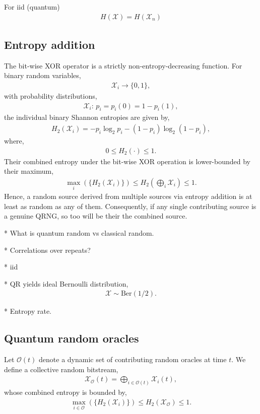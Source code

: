\documentclass[twocolumn, aps, amsmath, amssymb, nofootinbib, superscriptaddress, longbibliography, floatfix, eqsecnum, rmp]{revtex4-2}
\begin{document}
For iid (quantum)
\begin{align}
	H(\mathcal{X}) = H(\mathcal{X}_n)
\end{align}

\subsection{Entropy addition} \label{sec:entropy_add}

The bit-wise XOR operator is a strictly non-entropy-decreasing function. For binary random variables,
\begin{align}
	\mathcal{X}_i\to\{0,1\},
\end{align}
with probability distributions,
\begin{align}
	\mathcal{X}_i:\, p_i=p_i(0)=1-p_i(1),
\end{align}
the individual binary Shannon entropies are given by,
\begin{align}
	H_2(\mathcal{X}_i) = -p_i\log_2 p_i - (1-p_i)\log_2(1-p_i),
\end{align}
where,
\begin{align}
	0 \leq H_2(\cdot) \leq 1.
\end{align}
Their combined entropy under the bit-wise XOR operation is lower-bounded by their maximum,
\begin{align}
	\max_i(\{H_2(\mathcal{X}_i)\}) \leq H_2\left(\bigoplus_i \mathcal{X}_i\right) \leq 1.
\end{align}
Hence, a random source derived from multiple sources via entropy addition is at least as random as any of them. Consequently, if any single contributing source is a genuine QRNG, so too will be their the combined source.

* What is quantum random vs classical random.

* Correlations over repeats?

* iid

* QR yields ideal Bernoulli distribution,
\begin{align}
	\mathcal{X} \sim \mathrm{Ber}(1/2).
\end{align}

* Entropy rate.

\subsection{Quantum random oracles} \label{sec:quantum_rand_oracles}

Let $\mathcal{O}(t)$ denote a dynamic set of contributing random oracles at  time $t$. We define a collective random bitstream,
\begin{align}
	\mathcal{X}_\mathcal{O}(t) = \bigoplus_{i\in\mathcal{O}(t)} \mathcal{X}_i(t),
\end{align}
whose combined entropy is bounded by,
\begin{align}
	\max_{i\in\mathcal{O}}(\{H_2(\mathcal{X}_i)\}) \leq H_2(\mathcal{X}_{\mathcal{O}}) \leq 1.
\end{align}
\end{document}
